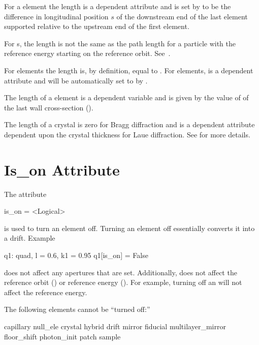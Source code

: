 For a  element the length  is a dependent attribute and is set by \bmad to be the
difference in longitudinal position $s$ of the downstream end of the last element supported relative
to the upstream end of the first element.

For s, the length  is not the same as the path length for a particle with the
reference energy starting on the reference orbit. See~.

For  elements the  length is, by definition, equal to . For 
elements,  is a dependent attribute and will be automatically set to  by \bmad.

The length of a  element is a dependent variable and is given by the value of 
of the last wall cross-section ().

The length of a crystal is zero for Bragg diffraction and is a dependent attribute dependent upon
the crystal thickness for Laue diffraction. See  for more details.

\section{Is_on Attribute}
\label{s:is.on}

The  attribute
\begin{example}
  is_on = <Logical>
\end{example}
is used to turn an element off. Turning an element off essentially converts it into a drift.
Example
\begin{example}
  q1: quad, l = 0.6, k1 = 0.95
  q1[is_on] = False
\end{example}

 does not affect any apertures that are set. Additionally,  does not affect the
reference orbit () or reference energy (). For example, turning off an
 will not affect the reference energy.

The following elements cannot be ``turned off:''
\begin{example}
  capillary           null_ele       
  crystal             hybrid
  drift               mirror
  fiducial            multilayer_mirror
  floor_shift         photon_init
  patch               sample
\end{example}

